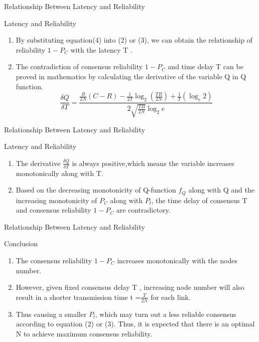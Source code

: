 \documentclass{beamer}
\begin{document}
\begin{frame}{Relationship Between Latency and Reliability}
 \begin{block}{Latency and Reliability}

 \begin{enumerate}
     \item
    By substituting equation(4) into (2) or (3), we can obtain the relationship of reliability $1-P_C$ with the latency T .
    \item
    The contradiction of consensus reliability $1-P_C$ and time delay T can be proved in mathematics by calculating the derivative of the variable Q in Q function.
    \begin{equation}
        \frac{\delta Q}{\delta T}=\frac{\frac{B}{2N}(C-R)-\frac{1}{2T}\log_{2}(\frac{TB}{2N})+\frac{1}{T}(\log_{e}2)}{2\sqrt{\frac{TB}{2N}}\log_{2}e} 
    \end{equation}
\end{enumerate}
\end{block}
\end{frame}
\begin{frame}{Relationship Between Latency and Reliability}
 \begin{block}{Latency and Reliability}

 \begin{enumerate}
     \item
    The derivative $\frac{\delta Q}{\delta T}$ is always positive,which means the variable increases monotonically along with T.
     \item
    Based on the decreasing monotonicity of Q-function $f_{Q}$ along with Q and the increasing monotonicity of $P_C$ along with $P_l$, the time delay of consensus T and consensus reliability $1 - P_C$ are contradictory.
 \end{enumerate}
\end{block}
\end{frame}

\begin{frame}{Relationship Between Latency and Reliability}
 \begin{block}{Conclusion}

 \begin{enumerate}
     \item
    The consensus reliability $1 - P_C$ increases monotonically with the nodes number.
     \item
    However, given fixed consensus delay T , increasing node number will also result in a shorter transmission time t =$\frac{T}{2N}$ for each link.
     \item 
    Thus causing a smaller $P_l$, which may turn out a less reliable consensus according to equation (2) or (3). Thus, it is expected that there is an optimal N to achieve maximum consensus reliability.
 \end{enumerate}
\end{block}
\end{frame}
\end{document}
